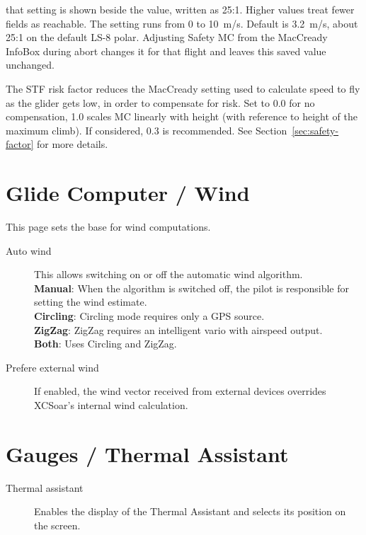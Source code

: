 \begin{description}
  that setting is shown beside the value, written as 25:1.  Higher values
  treat fewer fields as reachable.
  The setting runs from 0 to 10~m/s.
  Default is 3.2~m/s, about 25:1 on the default LS-8 polar.
  Adjusting Safety MC from the MacCready InfoBox during abort changes
  it for that flight and leaves this saved value unchanged.\label{conf:safetyMC} 
\item[STF risk factor*] 
  The STF risk factor reduces the MacCready setting used to calculate
  speed to fly as the glider gets low, in order to compensate for
  risk.  Set to 0.0 for no compensation, 1.0 scales MC linearly with
  height (with reference to height of the maximum climb). If considered, 0.3 is recommended.  
  See Section~\ref{sec:safety-factor} for more details.
\end{description}


\section{Glide Computer / Wind} \label{sec:wind}

This page sets the base for wind computations.

\begin{description}
\item[Auto wind]  \label{conf:autowind} This allows switching on or off the
  automatic wind algorithm. \\
  {\bf Manual}: When the algorithm is switched off, the pilot is responsible for
  setting the wind estimate. \\
  {\bf Circling}: Circling mode requires only a GPS source. \\
  {\bf ZigZag}: ZigZag requires an intelligent vario with airspeed output. \\
  {\bf Both}:  Uses Circling and ZigZag.
\item[Prefere external wind]  If enabled, the wind vector received from external
  devices overrides XCSoar's internal wind calculation.
\end{description}


\section{Gauges / Thermal Assistant}

\begin{description}
\item[Thermal assistant] \label{conf:thermalassistant} Enables the display of the
  Thermal Assistant and selects its position on the screen.
\end{description}



